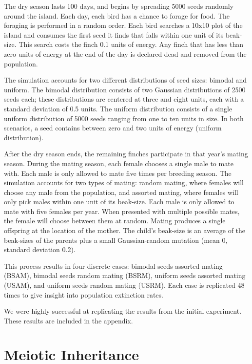 \documentclass{article}
\begin{document}
The dry season lasts 100 days, and begins by spreading 5000 seeds randomly around the island. Each day, each bird has a chance to forage for food. The foraging is performed in a random order. Each bird searches a 10x10 plot of the island and consumes the first seed it finds that falls within one unit of its beak-size. This search costs the finch 0.1 units of energy. Any finch that has less than zero units of energy at the end of the day is declared dead and removed from the population.

The simulation accounts for two different distributions of seed sizes: bimodal and uniform. The bimodal distribution consists of two Gaussian distributions of 2500 seeds each; these distributions are centered at three and eight units, each with a standard deviation of 0.5 units. The uniform distribution consists of a single uniform distribution of 5000 seeds ranging from one to ten units in size. In both scenarios, a seed contains between zero and two units of energy (uniform distribution).

After the dry season ends, the remaining finches participate in that year's mating season. During the mating season, each female chooses a single male to mate with. Each male is only allowed to mate five times per breeding season. The simulation accounts for two types of mating: random mating, where females will choose any male from the population, and assorted mating, where females will only pick males within one unit of its beak-size. Each male is only allowed to mate with five females per year. When presented with multiple possible mates, the female will choose between them at random. Mating produces a single offspring at the location of the mother. The child’s beak-size is an average of the beak-sizes of the parents plus a small Gaussian-random mutation (mean 0, standard deviation 0.2).

This process results in four discrete cases: bimodal seeds assorted mating (BSAM), bimodal seeds random mating (BSRM), uniform seeds assorted mating (USAM), and uniform seeds random mating (USRM). Each case is replicated 48 times to give insight into population extinction rates. 

We were highly successful at replicating the results from the initial experiment. These results are included in the appendix. 



\section{Meiotic Inheritance}
\end{document}

